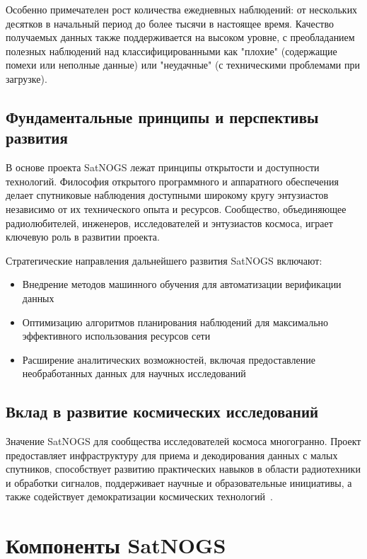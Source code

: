 Особенно примечателен рост количества ежедневных наблюдений: от нескольких
десятков в начальный период до более тысячи в настоящее время. Качество
получаемых данных также поддерживается на высоком уровне, с преобладанием
полезных наблюдений над классифицированными как "плохие" (содержащие помехи или
неполные данные) или "неудачные" (с техническими проблемами при загрузке).

\subsection{Фундаментальные принципы и перспективы развития}

В основе проекта SatNOGS лежат принципы открытости и доступности технологий.
Философия открытого программного и аппаратного обеспечения делает спутниковые
наблюдения доступными широкому кругу энтузиастов независимо от их технического
опыта и ресурсов. Сообщество, объединяющее радиолюбителей, инженеров,
исследователей и энтузиастов космоса, играет ключевую роль в развитии проекта.

Стратегические направления дальнейшего развития SatNOGS включают:

\begin{itemize}
	\item Внедрение методов машинного обучения для автоматизации верификации данных
	\item Оптимизацию алгоритмов планирования наблюдений для максимально эффективного использования ресурсов сети
	\item Расширение аналитических возможностей, включая предоставление необработанных данных для научных исследований
\end{itemize}

\subsection{Вклад в развитие космических исследований}

Значение SatNOGS для сообщества исследователей космоса многогранно. Проект
предоставляет инфраструктуру для приема и декодирования данных с малых
спутников, способствует развитию практических навыков в области радиотехники и
обработки сигналов, поддерживает научные и образовательные инициативы, а также
содействует демократизации космических технологий~\cite{satnogs_general_docs}.

\section{Компоненты SatNOGS}

